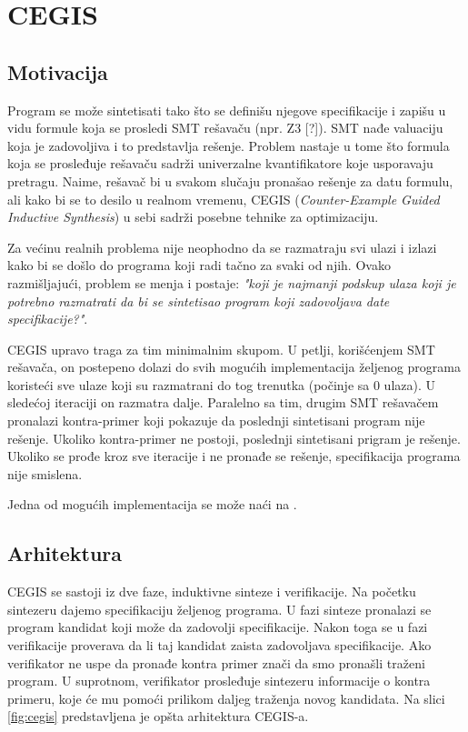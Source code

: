 \section{CEGIS}
\label{sec:cegis}


\subsection{Motivacija}
\label{subsec:Motivacija}

Program se može sintetisati tako što se definišu njegove specifikacije i zapišu u vidu formule koja se prosledi SMT rešavaču (npr. Z3 [?]). SMT nađe valuaciju koja je zadovoljiva i to predstavlja rešenje. Problem nastaje u tome što formula koja se prosleđuje rešavaču sadrži univerzalne kvantifikatore koje usporavaju pretragu. Naime, rešavač bi u svakom slučaju pronašao rešenje za datu formulu, ali kako bi se to desilo u realnom vremenu, CEGIS (\emph{Counter-Example Guided Inductive Synthesis}) u sebi sadrži posebne tehnike za optimizaciju.

Za većinu realnih problema nije neophodno da se razmatraju svi ulazi i izlazi kako bi se došlo do programa koji radi tačno za svaki od njih. Ovako razmišljajući, problem se menja i postaje: \emph{"koji je najmanji podskup ulaza koji je potrebno razmatrati da bi se sintetisao program koji zadovoljava date specifikacije?"}.

CEGIS upravo traga za tim minimalnim skupom. U petlji, korišćenjem SMT rešavača, on postepeno dolazi do svih mogućih implementacija že\-lje\-nog programa koristeći sve ulaze koji su razmatrani do tog trenutka (počinje sa 0 ulaza). U sledećoj iteraciji on razmatra dalje. Paralelno sa tim, drugim SMT rešavačem pronalazi kontra-primer koji pokazuje da poslednji sintetisani program nije rešenje. Ukoliko kontra-primer ne postoji, poslednji sintetisani prigram je rešenje. Ukoliko se prođe kroz sve iteracije i ne pronađe se rešenje, specifikacija programa nije smislena.

Jedna od mogućih implementacija se može naći na \cite{CEGISimpl}.


\subsection{Arhitektura}
\label{subsec:Arhitektura}

CEGIS se sastoji iz dve faze, induktivne sinteze i verifikacije. Na početku sintezeru dajemo specifikaciju željenog programa. U fazi sinteze pronalazi se program kandidat koji može da zadovolji specifikacije. Nakon toga se u fazi verifikacije proverava da li taj kandidat zaista zadovoljava specifikacije. Ako verifikator ne uspe da pronađe kontra primer znači da smo pronašli traženi program. U suprotnom, verifikator prosleđuje sintezeru informacije o kontra primeru, koje će mu pomoći prilikom daljeg traženja novog kandidata. Na slici \ref{fig:cegis} predstavljena je opšta arhitektura CEGIS-a.

